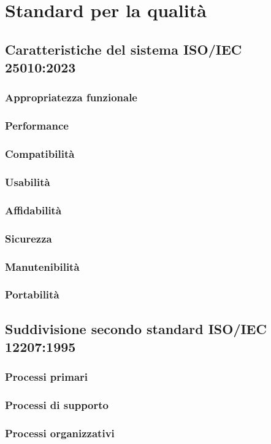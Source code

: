 \section{Standard per la qualità}

\subsection{Caratteristiche del sistema ISO/IEC 25010:2023}
\subsubsection{Appropriatezza funzionale}

\subsubsection{Performance}

\subsubsection{Compatibilità}

\subsubsection{Usabilità}

\subsubsection{Affidabilità}

\subsubsection{Sicurezza}

\subsubsection{Manutenibilità}

\subsubsection{Portabilità}

\subsection{Suddivisione secondo standard ISO/IEC 12207:1995}
\subsubsection{Processi primari}

\subsubsection{Processi di supporto}

\subsubsection{Processi organizzativi}